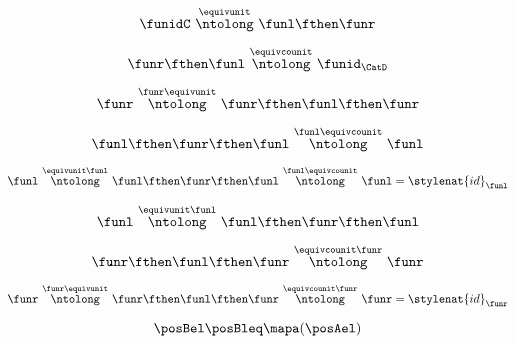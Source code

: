 {\begin{forslides}
        \begin{equation}
            \label{eq:slides_adjunctions_50}
            \funidC \ \overset{\equivunit}{\ntolong}\ \funl \fthen \funr
        \end{equation}

        \begin{equation}
            \label{eq:slides_adjunctions_51}
            \funr \fthen \funl \ \overset{\equivcounit}{\ntolong}\ \funid_\CatD
        \end{equation}

        \begin{equation}
            \label{eq:slides_adjunctions_52}
            \funr \ \overset{\funr\equivunit}{\ntolong}\ \funr \fthen \funl \fthen \funr
        \end{equation}

        \begin{equation}
            \label{eq:slides_adjunctions_53}
            \funl \fthen \funr \fthen \funl \ \overset{\funl \equivcounit}{\ntolong}\ \funl
        \end{equation}

        \begin{equation}
            \label{eq:slides_adjunctions_53b}
            \funl \ \overset{\equivunit \funl }{\ntolong}\ \funl \fthen \funr  \fthen \funl \ \overset{\funl \equivcounit}{\ntolong}\ \funl = \stylenat{id}_\funl
        \end{equation}

        \begin{equation}
            \label{eq:slides_adjunctions_54}
            \funl \ \overset{\equivunit \funl }{\ntolong}\ \funl \fthen \funr \fthen \funl
        \end{equation}

        \begin{equation}
            \label{eq:slides_adjunctions_55}
            \funr \fthen \funl \fthen \funr  \ \overset{\equivcounit \funr}{\ntolong}\ \funr
        \end{equation}

        \begin{equation}
            \label{eq:slides_adjunctions_55b}
            \funr \ \overset{\funr\equivunit}{\ntolong}\ \funr \fthen \funl \fthen \funr  \ \overset{\equivcounit \funr}{\ntolong}\ \funr  =  \stylenat{id}_\funr
        \end{equation}

        \begin{equation}
            \label{eq:slides_adjunctions_56}
            \posBel \posBleq \mapa(\posAel)
        \end{equation}


\end{forslides}}
